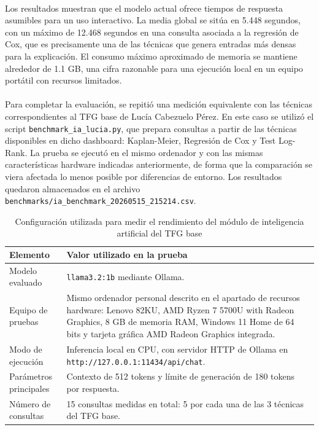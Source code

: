\paragraph*{}Los resultados muestran que el modelo actual ofrece tiempos de respuesta asumibles para un uso interactivo. La media global se sitúa en 5.448 segundos, con un máximo de 12.468 segundos en una consulta asociada a la regresión de Cox, que es precisamente una de las técnicas que genera entradas más densas para la explicación. El consumo máximo aproximado de memoria se mantiene alrededor de 1.1 GB, una cifra razonable para una ejecución local en un equipo portátil con recursos limitados.

\paragraph*{}Para completar la evaluación, se repitió una medición equivalente con las técnicas correspondientes al TFG base de Lucía Cabezuelo Pérez. En este caso se utilizó el script \texttt{benchmark\_ia\_lucia.py}, que prepara consultas a partir de las técnicas disponibles en dicho dashboard: Kaplan-Meier, Regresión de Cox y Test Log-Rank. La prueba se ejecutó en el mismo ordenador y con las mismas características hardware indicadas anteriormente, de forma que la comparación se viera afectada lo menos posible por diferencias de entorno. Los resultados quedaron almacenados en el archivo \texttt{benchmarks/ia\_benchmark\_20260515\_215214.csv}.

\begin{table}[H]
\centering
\small
\begin{tabularx}{\textwidth}{|p{}|X|}
\hline
\textbf{Elemento} & \textbf{Valor utilizado en la prueba} \\ \hline
Modelo evaluado & \texttt{llama3.2:1b} mediante Ollama. \\ \hline
Equipo de pruebas & Mismo ordenador personal descrito en el apartado de recursos hardware: Lenovo 82KU, AMD Ryzen 7 5700U with Radeon Graphics, 8 GB de memoria RAM, Windows 11 Home de 64 bits y tarjeta gráfica AMD Radeon Graphics integrada. \\ \hline
Modo de ejecución & Inferencia local en CPU, con servidor HTTP de Ollama en \texttt{http://127.0.0.1:11434/api/chat}. \\ \hline
Parámetros principales & Contexto de 512 tokens y límite de generación de 180 tokens por respuesta. \\ \hline
Número de consultas & 15 consultas medidas en total: 5 por cada una de las 3 técnicas del TFG base. \\ \hline
\end{tabularx}
\caption{Configuración utilizada para medir el rendimiento del módulo de inteligencia artificial del TFG base}
\label{tab:config_benchmark_ia_lucia}
\normalsize
\end{table}

